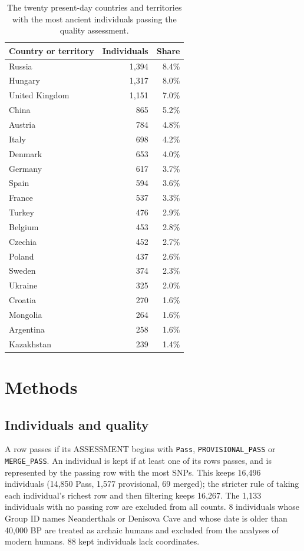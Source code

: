 \documentclass[11pt,a4paper]{article}
\begin{document}
\begin{table}[tbp]\centering\small\caption{The twenty present-day countries and territories with the most ancient individuals passing the quality assessment.}\label{tab:countries}\begin{tabular}{lrr}\toprule Country or territory & Individuals & Share\\\midrule
Russia & 1,394 & 8.4\%\\
Hungary & 1,317 & 8.0\%\\
United Kingdom & 1,151 & 7.0\%\\
China & 865 & 5.2\%\\
Austria & 784 & 4.8\%\\
Italy & 698 & 4.2\%\\
Denmark & 653 & 4.0\%\\
Germany & 617 & 3.7\%\\
Spain & 594 & 3.6\%\\
France & 537 & 3.3\%\\
Turkey & 476 & 2.9\%\\
Belgium & 453 & 2.8\%\\
Czechia & 452 & 2.7\%\\
Poland & 437 & 2.6\%\\
Sweden & 374 & 2.3\%\\
Ukraine & 325 & 2.0\%\\
Croatia & 270 & 1.6\%\\
Mongolia & 264 & 1.6\%\\
Argentina & 258 & 1.6\%\\
Kazakhstan & 239 & 1.4\%\\
\bottomrule\end{tabular}\end{table}

\section{Methods}
\subsection{Individuals and quality}
A row passes if its ASSESSMENT begins with \texttt{Pass}, \texttt{PROVISIONAL\_PASS} or \texttt{MERGE\_PASS}. An individual is kept if at least one of its rows passes, and is represented by the passing row with the most SNPs. This keeps 16,496 individuals (14,850 Pass, 1,577 provisional, 69 merged); the stricter rule of taking each individual's richest row and then filtering keeps 16,267. The 1,133 individuals with no passing row are excluded from all counts. 8 individuals whose Group ID names Neanderthals or Denisova Cave and whose date is older than 40,000 BP are treated as archaic humans and excluded from the analyses of modern humans. 88 kept individuals lack coordinates.
\end{document}
